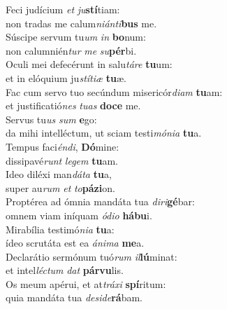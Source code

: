 \oddverse Feci judícium \textit{et} \textit{ju}\textbf{stí}tiam:~\*\\
\oddverse non tradas me calum\textit{ni}\textit{án}\textit{ti}\textbf{bus} me.\\
\evenverse Súscipe servum tu\textit{um} \textit{in} \textbf{bo}num:~\*\\
\evenverse non calumnién\textit{tur} \textit{me} \textit{su}\textbf{pér}bi.\\
\oddverse Oculi mei defecérunt in salu\textit{tá}\textit{re} \textbf{tu}um:~\*\\
\oddverse et in elóquium ju\textit{stí}\textit{ti}\textit{æ} \textbf{tu}æ.\\
\evenverse Fac cum servo tuo secúndum misericór\textit{di}\textit{am} \textbf{tu}am:~\*\\
\evenverse et justificatió\textit{nes} \textit{tu}\textit{as} \textbf{do}\textbf{ce} me.\\
\oddverse Servus tu\textit{us} \textit{sum} \textbf{e}go:~\*\\
\oddverse da mihi intelléctum, ut sciam testi\textit{mó}\textit{ni}\textit{a} \textbf{tu}a.\\
\evenverse Tempus faci\textit{én}\textit{di}, \textbf{Dó}mine:~\*\\
\evenverse dissipavé\textit{runt} \textit{le}\textit{gem} \textbf{tu}am.\\
\oddverse Ideo diléxi man\textit{dá}\textit{ta} \textbf{tu}a,~\*\\
\oddverse super au\textit{rum} \textit{et} \textit{to}\textbf{pá}\textbf{zi}on.\\
\evenverse Proptérea ad ómnia mandáta tua \textit{di}\textit{ri}\textbf{gé}bar:~\*\\
\evenverse omnem viam iníquam \textit{ó}\textit{di}\textit{o} \textbf{há}\textbf{bu}i.\\
\oddverse Mirabília testimó\textit{ni}\textit{a} \textbf{tu}a:~\*\\
\oddverse ídeo scrutáta est ea \textit{á}\textit{ni}\textit{ma} \textbf{me}a.\\
\evenverse Declarátio sermónum tuó\textit{rum} \textit{il}\textbf{lú}minat:~\*\\
\evenverse et intel\textit{lé}\textit{ctum} \textit{dat} \textbf{pár}\textbf{vu}lis.\\
\oddverse Os meum apérui, et at\textit{trá}\textit{xi} \textbf{spí}ritum:~\*\\
\oddverse quia mandáta tua \textit{de}\textit{si}\textit{de}\textbf{rá}bam.\\
